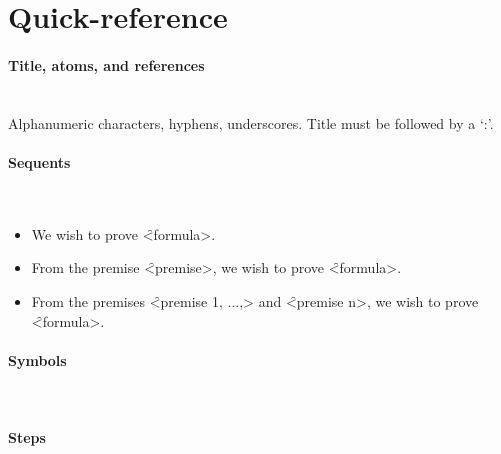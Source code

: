 \documentclass[manual.tex]{subfiles}
\begin{document}
\section{Quick-reference}\label{qr}

\paragraph{Title, atoms, and references} ~\\
Alphanumeric characters, hyphens, underscores.
Title must be followed by a `:'.

\paragraph{Sequents} ~
\begin{itemize}
\item We wish to prove \f{<formula>}.
\item From the premise \f{<premise>}, we wish to prove \f{<formula>}.
\item From the premises \f{<premise 1, ...,>} and 
        \f{<premise n>}, we wish to prove \f{<formula>}.
\end{itemize}

\paragraph{Symbols} ~

\begin{figure}[H]

\end{figure}

\paragraph{Steps} ~

\begin{figure}[H]
\scriptsize

\end{figure}
\end{document}
